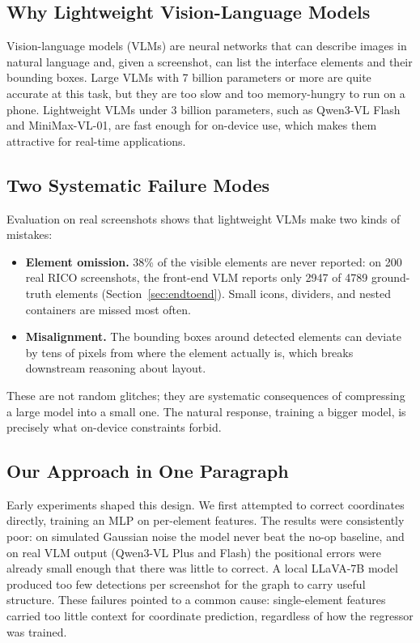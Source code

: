 \documentclass[11pt, letterpaper]{article}
\begin{document}
\subsection{Why Lightweight Vision-Language Models}
Vision-language models (VLMs) are neural networks that can describe images in
natural language and, given a screenshot, can list the interface elements and
their bounding boxes. Large VLMs with 7 billion parameters or more are quite
accurate at this task, but they are too slow and too memory-hungry to run on a
phone. Lightweight VLMs under 3 billion parameters, such as Qwen3-VL Flash
\cite{bai2023qwen} and MiniMax-VL-01, are fast enough for on-device use, which
makes them attractive for real-time applications.

\subsection{Two Systematic Failure Modes}
Evaluation on real screenshots shows that lightweight VLMs make two
kinds of mistakes:

\begin{itemize}
\item \textbf{Element omission.} 38\% of the visible elements are never
reported: on 200 real RICO screenshots, the front-end VLM reports only 2947
of 4789 ground-truth elements (Section~\ref{sec:endtoend}). Small icons,
dividers, and nested containers are missed most often.
\item \textbf{Misalignment.} The bounding boxes around detected elements can
deviate by tens of pixels from where the element actually is, which breaks
downstream reasoning about layout.
\end{itemize}

These are not random glitches; they are systematic consequences of
compressing a large model into a small one. The natural response, training a
bigger model, is precisely what on-device constraints forbid.

\subsection{Our Approach in One Paragraph}
Early experiments shaped this design. We first attempted to correct
coordinates directly, training an MLP on per-element features. The results
were consistently poor: on simulated Gaussian noise the model never beat the
no-op baseline, and on real VLM output (Qwen3-VL Plus and Flash) the
positional errors were already small enough that there was little to correct.
A local LLaVA-7B model produced too few detections per screenshot for the
graph to carry useful structure. These failures pointed to a common cause:
single-element features carried too little context for coordinate
prediction, regardless of how the regressor was trained.
\end{document}
